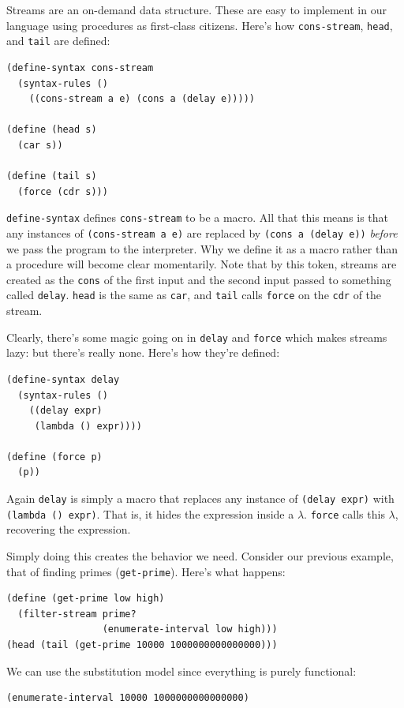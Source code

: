 \documentclass[9pt]{report}
\begin{document}
Streams are an on-demand data structure. These are easy to
implement in our language using procedures as first-class citizens.
Here's how \texttt{cons-stream}, \texttt{head}, and \texttt{tail} are defined:

\begin{verbatim}
(define-syntax cons-stream
  (syntax-rules ()
    ((cons-stream a e) (cons a (delay e)))))

(define (head s)
  (car s))

(define (tail s)
  (force (cdr s)))
\end{verbatim}

\texttt{define-syntax} defines \texttt{cons-stream} to be a macro. All that this
means is that any instances of \texttt{(cons-stream a e)} are replaced by
\texttt{(cons a (delay e))} \emph{before} we pass the program to the
interpreter. Why we define it as a macro rather than a procedure
will become clear momentarily. Note that by this token, streams are
created as the \texttt{cons} of the first input and the second input
passed to something called \texttt{delay}. \texttt{head} is the same as \texttt{car},
and \texttt{tail} calls \texttt{force} on the \texttt{cdr} of the stream.

Clearly, there's some magic going on in \texttt{delay} and \texttt{force} which
makes streams lazy: but there's really none. Here's how they're
defined:

\begin{verbatim}
(define-syntax delay
  (syntax-rules ()
    ((delay expr)
     (lambda () expr))))

(define (force p)
  (p))
\end{verbatim}

Again \texttt{delay} is simply a macro that replaces any instance of
\texttt{(delay expr)} with \texttt{(lambda () expr)}. That is, it hides the
expression inside a \(\lambda\). \texttt{force} calls this \(\lambda\), recovering
the expression.

Simply doing this creates the behavior we need. Consider our
previous example, that of finding primes (\texttt{get-prime}). Here's what
happens:

\begin{verbatim}
(define (get-prime low high)
  (filter-stream prime?
                 (enumerate-interval low high)))
(head (tail (get-prime 10000 1000000000000000)))
\end{verbatim}

We can use the substitution model since everything is purely
functional:
\begin{verbatim}
(enumerate-interval 10000 1000000000000000)
\end{verbatim}
\end{document}
